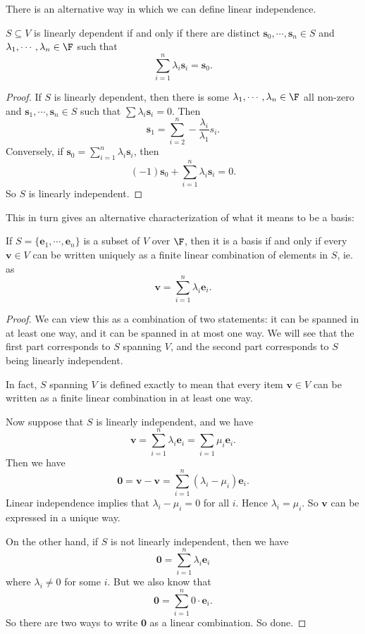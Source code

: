 \documentclass[a4paper]{article}
\begin{document}
There is an alternative way in which we can define linear independence.
\begin{lemma}
  $S\subseteq V$ is linearly dependent if and only if there are distinct $\mathbf{s}_0, \cdots, \mathbf{s}_n \in S$ and $\lambda_1, \cdots, \lambda_n\in \F$ such that
  \[
    \sum_{i = 1}^n \lambda_i \mathbf{s}_i = \mathbf{s}_0.
  \]
\end{lemma}

\begin{proof}
  If $S$ is linearly dependent, then there is some $\lambda_1, \cdots, \lambda_n \in \F$ all non-zero and $\mathbf{s}_1,\cdots, \mathbf{s}_n \in S$ such that $\sum \lambda_i \mathbf{s}_i = 0$. Then
  \[
    \mathbf{s}_1 = \sum_{i = 2}^n -\frac{\lambda_i}{\lambda_1} s_i.
  \]
  Conversely, if $\mathbf{s}_0 = \sum_{i = 1}^n \lambda_i \mathbf{s}_i$, then
  \[
    (-1)\mathbf{s}_0 + \sum_{i = 1}^n \lambda_i \mathbf{s}_i = 0.
  \]
  So $S$ is linearly independent.
\end{proof}

This in turn gives an alternative characterization of what it means to be a basis:
\begin{prop}
  If $S = \{\mathbf{e}_1, \cdots, \mathbf{e}_n\}$ is a subset of $V$ over $\F$, then it is a basis if and only if every $\mathbf{v}\in V$ can be written uniquely as a finite linear combination of elements in $S$, ie. as
  \[
    \mathbf{v} = \sum_{i = 1}^n \lambda_i \mathbf{e}_i.
  \]
\end{prop}

\begin{proof}
  We can view this as a combination of two statements: it can be spanned in at least one way, and it can be spanned in at most one way. We will see that the first part corresponds to $S$ spanning $V$, and the second part corresponds to $S$ being linearly independent.

  In fact, $S$ spanning $V$ is defined exactly to mean that every item $\mathbf{v}\in V$ can be written as a finite linear combination in at least one way.

  Now suppose that $S$ is linearly independent, and we have
  \[
    \mathbf{v} = \sum_{i = 1}^n \lambda_i \mathbf{e}_i = \sum_{i = 1}\mu_i \mathbf{e}_i.
  \]
  Then we have
  \[
    \mathbf{0} = \mathbf{v} - \mathbf{v} = \sum_{i = 1}^n (\lambda_i - \mu_i) \mathbf{e}_i.
  \]
  Linear independence implies that $\lambda_i - \mu_i = 0$ for all $i$. Hence $\lambda_i = \mu_i$. So $\mathbf{v}$ can be expressed in a unique way.

  On the other hand, if $S$ is not linearly independent, then we have
  \[
    \mathbf{0} = \sum_{i = 1}^n \lambda_i \mathbf{e}_i
  \]
  where $\lambda_i \not= 0$ for some $i$. But we also know that
  \[
    \mathbf{0} = \sum_{i = 1}^n 0\cdot \mathbf{e}_i.
  \]
  So there are two ways to write $\mathbf{0}$ as a linear combination. So done.
\end{proof}
\end{document}
